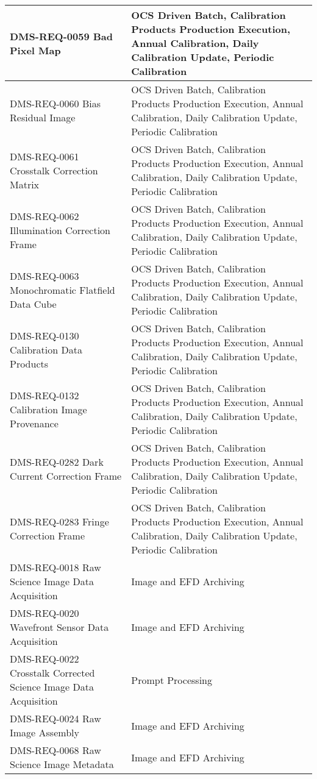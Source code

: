 \begin{xtabular}{p{0.4\textwidth}p{0.55\textwidth}}
DMS-REQ-0059 Bad Pixel Map & OCS Driven Batch, Calibration Products
Production Execution, Annual Calibration, Daily Calibration Update,
Periodic Calibration\\ \hline
DMS-REQ-0060 Bias Residual Image & OCS Driven Batch, Calibration
Products Production Execution, Annual Calibration, Daily Calibration
Update, Periodic Calibration\\ \hline
DMS-REQ-0061 Crosstalk Correction Matrix & OCS Driven Batch, Calibration
Products Production Execution, Annual Calibration, Daily Calibration
Update, Periodic Calibration\\ \hline
DMS-REQ-0062 Illumination Correction Frame & OCS Driven Batch,
Calibration Products Production Execution, Annual Calibration, Daily
Calibration Update, Periodic Calibration\\ \hline
DMS-REQ-0063 Monochromatic Flatfield Data Cube & OCS Driven Batch,
Calibration Products Production Execution, Annual Calibration, Daily
Calibration Update, Periodic Calibration\\ \hline
DMS-REQ-0130 Calibration Data Products & OCS Driven Batch, Calibration
Products Production Execution, Annual Calibration, Daily Calibration
Update, Periodic Calibration\\ \hline
DMS-REQ-0132 Calibration Image Provenance & OCS Driven Batch,
Calibration Products Production Execution, Annual Calibration, Daily
Calibration Update, Periodic Calibration\\ \hline
DMS-REQ-0282 Dark Current Correction Frame & OCS Driven Batch,
Calibration Products Production Execution, Annual Calibration, Daily
Calibration Update, Periodic Calibration\\ \hline
DMS-REQ-0283 Fringe Correction Frame & OCS Driven Batch, Calibration
Products Production Execution, Annual Calibration, Daily Calibration
Update, Periodic Calibration\\ \hline
DMS-REQ-0018 Raw Science Image Data Acquisition & Image and EFD
Archiving\\ \hline
DMS-REQ-0020 Wavefront Sensor Data Acquisition & Image and EFD
Archiving\\ \hline
DMS-REQ-0022 Crosstalk Corrected Science Image Data Acquisition & Prompt
Processing\\ \hline
DMS-REQ-0024 Raw Image Assembly & Image and EFD Archiving\\ \hline
DMS-REQ-0068 Raw Science Image Metadata & Image and EFD
Archiving\\ \hline

\end{xtabular}
